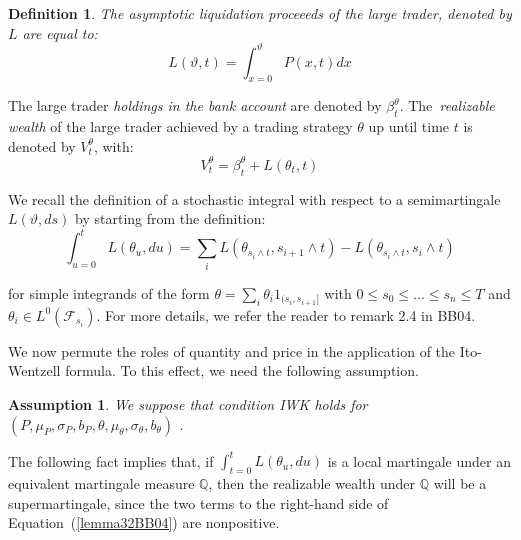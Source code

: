 \documentclass{article}
\newtheorem{definition}{Definition}
\newtheorem{assumption}{Assumption}
\begin{document}


\begin{definition}
The \textit{asymptotic liquidation proceeeds} of the large trader, denoted
by $L$ are equal to:\
\begin{equation*}
L(\vartheta ,t)=\int_{x=0}^{\vartheta }P(x,t)dx
\end{equation*}
\end{definition}

The large trader \textit{holdings in the bank account} are denoted by $\beta
_{t}^{\theta }$. The\textit{\ realizable wealth} of the large trader
achieved by a trading strategy $\theta $ up until time $t$ is denoted by $%
V_{t}^{\theta }$, with:%
\begin{equation*}
V_{t}^{\theta }=\beta _{t}^{\theta }+L(\theta _{t},t)
\end{equation*}

We recall the definition of a stochastic integral with respect to a
semimartingale $L(\vartheta ,ds)$ by starting from the definition:%
\begin{equation*}
\int_{u=0}^{t}L(\theta _{u},du)=\sum_{i}L(\theta _{s_{i}\wedge
t},s_{i+1}\wedge t)-L(\theta _{s_{i}\wedge t},s_{i}\wedge t)
\end{equation*}

for simple integrands of the form $\theta =\sum_{i}\theta
_{i}1_{(s_{i},s_{i+1}]}$ with $0\leq s_{0}\leq ...\leq s_{n}\leq T$ and $%
\theta _{i}\in L^{0}(\mathcal{F}_{s_{i}})$. For more details, we refer the
reader to remark 2.4 in BB04.

\bigskip

We now permute the roles of quantity and price in the application of the
Ito-Wentzell formula. To this effect, we need the following assumption.



\begin{assumption}
\label{ass::iwk_condition_P} We suppose that condition IWK holds for $(P,\mu
_{P},\sigma _{P},b_{P},\theta ,\mu _{\theta },\sigma _{\theta },b_{\theta })$%
.\bigskip
\end{assumption}

The following fact implies that, if $\int_{t=0}^{t}L(\theta _{u},du)$ is a
local martingale under an equivalent martingale measure $\mathbb{Q}$, then
the realizable wealth under $\mathbb{Q}$ will be a supermartingale, since
the two terms to the right-hand side of Equation~(\ref{lemma32BB04}) are
nonpositive.
\end{document}
